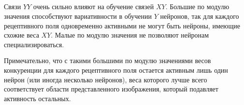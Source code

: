 \documentclass[a4paper]{article}
\begin{document}
\subsection{}
Связи $YY$ очень сильно влияют на обучение связей $XY$. Большие по модулю значения способствуют вариативности в обучении $Y$ нейронов, так для каждого рецептивного поля одновременно активными не могут быть нейроны, имеющие схожие веса $XY$. Малые по модулю значения не позволяют нейронам специализироваться. 

Примечательно, что с такими большими по модулю значениями весов конкуренции для каждого рецептивного поля остается активным лишь один нейрон (или иногда несколько нейронов), веса которого лучше всего соответствует области представленного изображения, который подавляет активность остальных.
\end{document}
